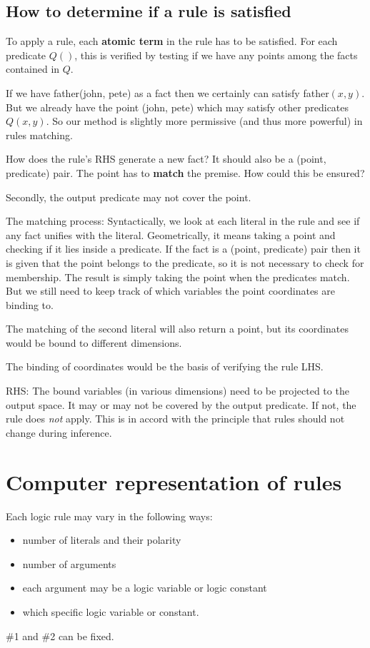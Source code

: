 \subsection{How to determine if a rule is satisfied}

To apply a rule, each \textbf{atomic term} in the rule has to be satisfied.  For each predicate $Q()$, this is verified by testing if we have any points among the facts contained in $Q$.

If we have \textsf{father(john, pete)} as a fact then we certainly can satisfy \textsf{father}$(x,y)$.  But we already have the point \textsf{(john, pete)} which may satisfy other predicates $Q(x,y)$.  So our method is slightly more permissive (and thus more powerful) in rules matching.

How does the rule's RHS generate a new fact?  It should also be a (point, predicate) pair.  The point has to \textbf{match} the premise.  How could this be ensured?

Secondly, the output predicate may not cover the point.

The matching process:  Syntactically, we look at each literal in the rule and see if any fact unifies with the literal.  Geometrically, it means taking a point and checking if it lies inside a predicate.  If the fact is a (point, predicate) pair then it is given that the point belongs to the predicate, so it is not necessary to check for membership.  The result is simply taking the point when the predicates match.  But we still need to keep track of which variables the point coordinates are binding to.

The matching of the second literal will also return a point, but its coordinates would be bound to different dimensions.  

The binding of coordinates would be the basis of verifying the rule LHS.

RHS:  The bound variables (in various dimensions) need to be projected to the output space.  It may or may not be covered by the output predicate.  If not, the rule does \textit{not} apply.  This is in accord with the principle that rules should not change during inference.

\section{Computer representation of rules}

Each logic rule may vary in the following ways:
\begin{itemize}
	\item number of literals and their polarity
	\item number of arguments
	\item each argument may be a logic variable or logic constant
	\item which specific logic variable or constant.
\end{itemize}
\#1 and \#2 can be fixed.

